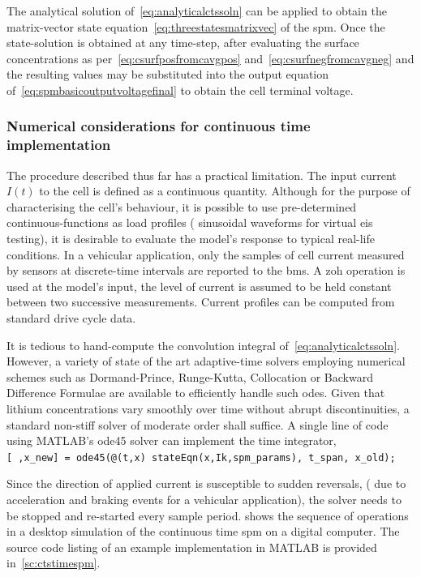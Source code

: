 The  analytical  solution  of~\cref{eq:analyticalctssoln}   can  be  applied  to
obtain  the matrix-vector  state equation~\cref{eq:threestatesmatrixvec}  of the
\gls{spm}.  Once  the  state-solution  is   obtained  at  any  time-step,  after
evaluating  the  surface   concentrations  as  per~\cref{eq:csurfposfromcavgpos}
and~\cref{eq:csurfnegfromcavgneg} and  the resulting  values may  be substituted
into the  output equation of~\cref{eq:spmbasicoutputvoltagefinal} to  obtain the
cell terminal voltage.

\subsubsection*{Numerical considerations for continuous time implementation}

The procedure described  thus far has a practical limitation.  The input current
$I(t)$ to the cell is defined as a continuous quantity. Although for the purpose
of characterising  the cell's  behaviour, it is  possible to  use pre-determined
continuous-functions as  load profiles  (\eg{} sinusoidal waveforms  for virtual
\gls{eis} testing), it is desirable to  evaluate the model's response to typical
real-life  conditions. In  a vehicular  application,  only the  samples of  cell
current  measured by  sensors at  discrete-time  intervals are  reported to  the
\gls{bms}. A \gls{zoh}  operation is used at the model's  input, \ie{} the level
of current is  assumed to be held constant between  two successive measurements.
Current profiles can be computed from standard drive cycle data.

It     is    tedious     to     hand-compute     the    convolution     integral
of~\cref{eq:analyticalctssoln}.  However,   a  variety  of  state   of  the  art
adaptive-time  solvers  employing  numerical  schemes  such  as  Dormand-Prince,
Runge-Kutta,  Collocation  or  Backward  Difference Formulae  are  available  to
efficiently  handle  such \gls{ode}s.  Given  that  lithium concentrations  vary
smoothly over time  without abrupt discontinuities, a  standard non-stiff solver
of moderate order  shall suffice. A single line of code  using MATLAB's ode45
solver can implement the time integrator, \eg{} \\ \texttt{[~,x_new] =
ode45(@(t,x) stateEqn(x,Ik,spm_params), t_span, x_old); }

Since  the direction  of applied  current  is susceptible  to sudden  reversals,
(\eg{}  due to  acceleration and  braking events  for a  vehicular application),
the  solver   needs  to   be  stopped  and   re-started  every   sample  period.
 shows the  sequence of operations in  a desktop simulation
of the continuous time \gls{spm} on  a digital computer. The source code listing
of an example implementation in MATLAB is provided in~\cref{sc:ctstimespm}.

